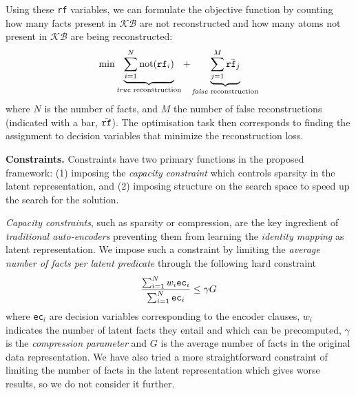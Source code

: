 Using these \texttt{rf} variables, we can formulate the objective function by counting how many facts present in $\mathcal{KB}$ are not reconstructed and how many atoms not present in $\mathcal{KB}$ are being reconstructed:
\begin{equation}
	\min \underbrace{\sum_{i=1}^{N}\text{not}(\text{\texttt{rf}}_i)}_{\text{\textit{true} reconstruction}} +  \underbrace{\sum_{j=1}^{M} \bar{\text{\texttt{rf}}_j}}_{\text{\textit{false} reconstruction}}
\end{equation}
where $N$ is the number of facts, and $M$ the number of false reconstructions (indicated with a bar, $\bar{\text{\texttt{rf}}}$). %
The optimisation task then corresponds to finding the assignment to decision variables that minimize the reconstruction loss.



\textbf{Constraints.} 
Constraints have two primary functions in the proposed framework: (1) imposing the \textit{capacity constraint} which controls sparsity in the latent representation, and (2) imposing structure on the search space to speed up the search for the solution.


\textit{Capacity constraints}, such as sparsity or compression, are the key ingredient of \textit{traditional auto-encoders} preventing them from learning the \textit{identity mapping} as latent representation.
We impose such a constraint by limiting the \textit{average number of facts per latent predicate} through the following hard constraint
$$ \frac{\sum_{i=1}^{N}w_i\text{\texttt{ec}}_i}{\sum_{i=1}^N\text{\texttt{ec}}_i} \leq \gamma G$$
where \texttt{ec}$_i$ are decision variables corresponding to the encoder clauses, $w_i$ indicates the number of latent facts they entail and which can be precomputed, $\gamma$ is the \textit{compression parameter} and $G$ is the average number of facts in the original data representation.
We have also tried a more straightforward constraint of limiting the number of facts in the latent representation which gives worse results, so we do not consider it further.


